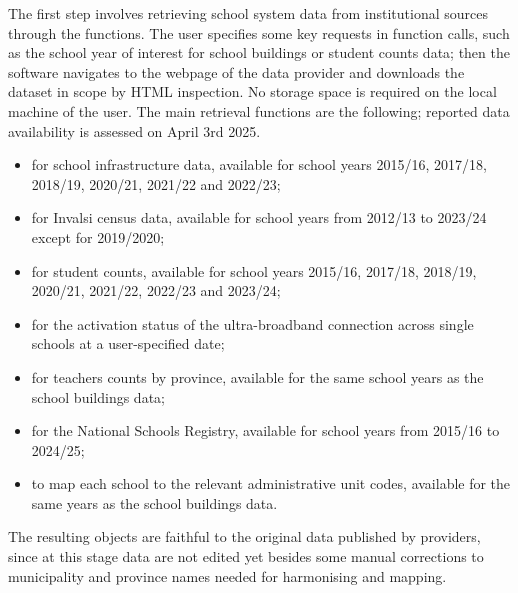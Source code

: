 \documentclass{book}
\begin{document}
The first step involves retrieving school system data from institutional sources through the \texttt{} functions. The user specifies some key requests in function calls, such as the school year of interest for school buildings or student counts data; then the software navigates to the webpage of the data provider and downloads the dataset in scope by HTML inspection. No storage space is required on the local machine of the user. The main retrieval functions are the following; reported data availability is assessed on April 3rd 2025.
\begin{itemize}
    \item \texttt{} for school infrastructure data, available for school years 2015/16, 2017/18, 2018/19, 2020/21, 2021/22 and 2022/23;
    \item \texttt{} for Invalsi census data, available for school years from 2012/13 to 2023/24 except for 2019/2020; 
    \item \texttt{} for student counts, available for school years 2015/16, 2017/18, 2018/19, 2020/21, 2021/22, 2022/23 and 2023/24;
    \item \texttt{} for the activation status of the ultra-broadband connection across single schools at a user-specified date;
    \item \texttt{} for teachers counts by province, available for the same school years as the school buildings data;
    \item \texttt{} for the National Schools Registry, available for school years from 2015/16 to 2024/25;
    \item \texttt{} to map each school to the relevant administrative unit codes, available for the same years as the school buildings data.
\end{itemize}
The resulting objects are faithful to the original data published by providers, since at this stage data are not edited yet besides some manual corrections to municipality and province names needed for harmonising and mapping. 
\end{document}
